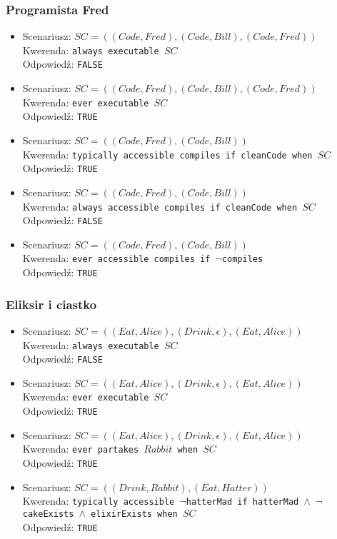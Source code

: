 \documentclass{article}
\begin{document}
\subsubsection{Programista Fred}
\begin{itemize}
\item
Scenariusz: $SC=((Code,Fred),(Code,Bill),(Code,Fred))$\\
Kwerenda: {\large\texttt{always executable $SC$}}\\
Odpowiedź: \texttt{FALSE}
\item
Scenariusz: $SC=((Code,Fred),(Code,Bill),(Code,Fred))$\\
Kwerenda: {\large\texttt{ever executable $SC$}}\\
Odpowiedź: \texttt{TRUE}
\item
Scenariusz: $SC=((Code,Fred),(Code,Bill))$\\
Kwerenda: {\large\texttt{typically accessible compiles if cleanCode when $SC$}}\\
Odpowiedź: \texttt{TRUE}
\item
Scenariusz: $SC=((Code,Fred),(Code,Bill))$\\
Kwerenda: {\large\texttt{always accessible compiles if cleanCode when $SC$}}\\
Odpowiedź: \texttt{FALSE}
\item
Scenariusz: $SC=((Code,Fred),(Code,Bill))$\\
Kwerenda: {\large\texttt{ever accessible compiles if $\neg$compiles}}\\
Odpowiedź: \texttt{TRUE}
\end{itemize}
\subsubsection{Eliksir i ciastko}
\begin{itemize}
\item
Scenariusz: $SC=((Eat,Alice),(Drink,\epsilon),(Eat,Alice))$\\
Kwerenda: {\large\texttt{always executable $SC$}}\\
Odpowiedź: \texttt{FALSE}
\item
Scenariusz: $SC=((Eat,Alice),(Drink,\epsilon),(Eat,Alice))$\\
Kwerenda: {\large\texttt{ever executable $SC$}}\\
Odpowiedź: \texttt{TRUE}
\item
Scenariusz: $SC=((Eat,Alice),(Drink,\epsilon),(Eat,Alice))$\\
Kwerenda: {\large\texttt{ever partakes $Rabbit$ when $SC$}}\\
Odpowiedź: \texttt{TRUE}
\item
Scenariusz: $SC=((Drink,Rabbit),(Eat,Hatter))$\\
Kwerenda: {\large\texttt{typically accessible $\neg$hatterMad if hatterMad $\wedge$ $\neg$cakeExists $\wedge$ elixirExists when $SC$}}\\
Odpowiedź: \texttt{TRUE}
\end{itemize}
\end{document}
